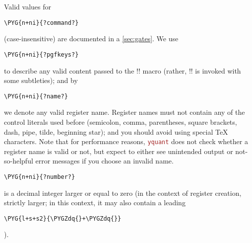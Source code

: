 \documentclass{scrartcl}
\def\pkg#1{\textcolor{brown}{\texttt{#1}}}
\def\Yquant{\pkg{yquant}}
\begin{document}
         Valid values for
         \begingroup%
         \begin{BVerbatim}[commandchars=\\\{\}]
\PYG{n+ni}{?command?}
         \end{BVerbatim}
         \space (case\hyp insensitive) are documented in a \cref{sec:gates}.
         We use
         \begin{BVerbatim}[commandchars=\\\{\}]
\PYG{n+ni}{?pgfkeys?}
         \end{BVerbatim}
         \space to describe any valid content passed to the \tex!\pgfkeys! macro (rather, \tex!\yquantset! is invoked with some subtleties); and by
         \begin{BVerbatim}[commandchars=\\\{\}]
\PYG{n+ni}{?name?}
         \end{BVerbatim}
         \space we denote any valid register name.
         Register names must not contain any of the control literals used before (semicolon, comma, parentheses, square brackets, dash, pipe, tilde, beginning star); and you should avoid using special \TeX{} characters.
         Note that for performance reasons, \Yquant{} does not check whether a register name is valid or not, but expect to either see unintended output or not\hyp so\hyp helpful error messages if you choose an invalid name.
         \begin{BVerbatim}[commandchars=\\\{\}]
\PYG{n+ni}{?number?}
         \end{BVerbatim}
         \space is a decimal integer larger or equal to zero (in the context of register creation, strictly larger; in this context, it may also contain a leading
         \begin{BVerbatim}[commandchars=\\\{\}]
\PYG{l+s+s2}{\PYGZdq{}+\PYGZdq{}}
         \end{BVerbatim}
         ).\endgroup
\end{document}
